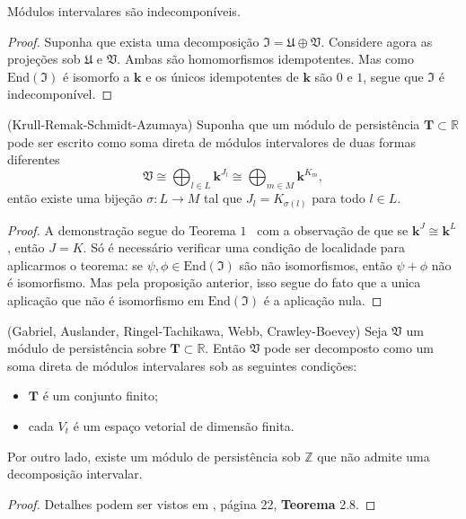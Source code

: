 \begin{propo}\label{prop:mod_int}
    Módulos intervalares são indecomponíveis. 
\end{propo}
\begin{proof}
    Suponha que exista uma decomposição $\mathfrak{I} = \mathfrak{U} \oplus \mathfrak{V}$. Considere agora
    as projeções sob $\mathfrak{U}$ e $\mathfrak{V}$. Ambas são homomorfismos idempotentes. Mas como 
    $\text{End}(\mathfrak{I})$ é isomorfo a $\mathbf{k}$ e os únicos idempotentes de $\mathbf{k}$ são 
    $0$ e $1$, segue que $\mathfrak{I}$ é indecomponível. 
\end{proof}

\begin{teo}{(Krull-Remak-Schmidt-Azumaya)}\label{teo:krull}
    Suponha que um módulo de persistência $\mathbf{T} \subset \mathbb{R}$ pode ser escrito como soma 
    direta de módulos intervalores de duas formas diferentes
    \begin{equation*}
        \mathfrak{V} \cong \bigoplus_{l \in L} \mathbf{k}^{J_l} \cong \bigoplus_{m \in M} \mathbf{k}^{K_m},
    \end{equation*}
    então existe uma bijeção $\sigma \colon L \to M$ tal que $J_l = K_{\sigma(l)}$ para todo $l \in L$. 
\end{teo}
\begin{proof}
    A demonstração segue do Teorema $1$~\cite{Azumaya1950} com a observação de que se $\mathbf{k}^J \cong 
    \mathbf{k}^L$, então $J=K$. Só é necessário verificar uma condição de localidade para aplicarmos o teorema:
    se $\psi, \phi \in \text{End}(\mathfrak{I})$ são não isomorfismos, então $\psi + \phi$ não é isomorfismo. 
    Mas pela proposição anterior, isso segue do fato que a unica aplicação que não é isomorfismo em 
    $\text{End}(\mathfrak{I})$ é a aplicação nula.
\end{proof}

\begin{teo}{(Gabriel, Auslander, Ringel-Tachikawa, Webb, Crawley-Boevey)}\label{teo:crawley}
    Seja $\mathfrak{V}$ um módulo de persistência sobre $\mathbf{T} \subset \mathbb{R}$. Então $\mathfrak{V}$
    pode ser decomposto como um soma direta de módulos intervalares sob as seguintes condições:
    \begin{itemize} 
        \item $\mathbf{T}$ é um conjunto finito;
        \item cada $V_t$ é um espaço vetorial de dimensão finita. 
    \end{itemize}
    Por outro lado, existe um módulo de persistência sob $\mathbb{Z}$ que não admite uma decomposição intervalar. 
\end{teo}  
\begin{proof}
    Detalhes podem ser vistos em \cite{Chazal2016}, página 22, \textbf{Teorema} 2.8.
\end{proof}

